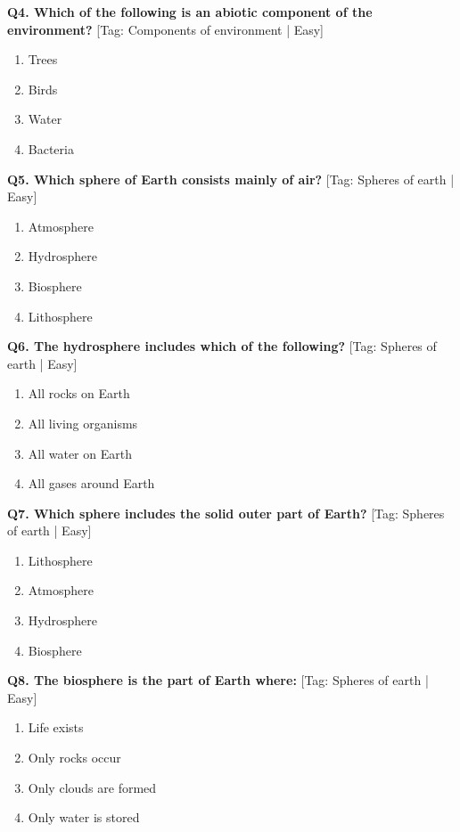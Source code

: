 \noindent\textbf{Q4. Which of the following is an abiotic component of the environment?} \hfill [Tag: Components of environment | Easy]
\begin{enumerate}[label=(\alph*),topsep=2pt,itemsep=1pt,partopsep=0pt,parsep=0pt]
    \item {Trees}
    \item {Birds}
    \item {Water}
    \item {Bacteria}
\end{enumerate}
\vspace{2mm}

\noindent\textbf{Q5. Which sphere of Earth consists mainly of air?} \hfill [Tag: Spheres of earth | Easy]
\begin{enumerate}[label=(\alph*),topsep=2pt,itemsep=1pt,partopsep=0pt,parsep=0pt]
    \item {Atmosphere}
    \item {Hydrosphere}
    \item {Biosphere}
    \item {Lithosphere}
\end{enumerate}
\vspace{2mm}

\noindent\textbf{Q6. The hydrosphere includes which of the following?} \hfill [Tag: Spheres of earth | Easy]
\begin{enumerate}[label=(\alph*),topsep=2pt,itemsep=1pt,partopsep=0pt,parsep=0pt]
    \item {All rocks on Earth}
    \item {All living organisms}
    \item {All water on Earth}
    \item {All gases around Earth}
\end{enumerate}
\vspace{2mm}

\noindent\textbf{Q7. Which sphere includes the solid outer part of Earth?} \hfill [Tag: Spheres of earth | Easy]
\begin{enumerate}[label=(\alph*),topsep=2pt,itemsep=1pt,partopsep=0pt,parsep=0pt]
    \item {Lithosphere}
    \item {Atmosphere}
    \item {Hydrosphere}
    \item {Biosphere}
\end{enumerate}
\vspace{2mm}

\noindent\textbf{Q8. The biosphere is the part of Earth where:} \hfill [Tag: Spheres of earth | Easy]
\begin{enumerate}[label=(\alph*),topsep=2pt,itemsep=1pt,partopsep=0pt,parsep=0pt]
    \item {Life exists}
    \item {Only rocks occur}
    \item {Only clouds are formed}
    \item {Only water is stored}
\end{enumerate}
\vspace{2mm}

